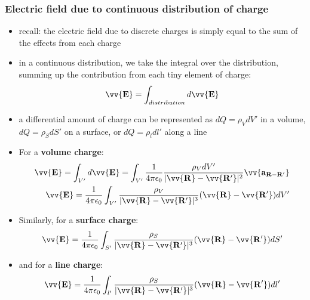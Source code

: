 \documentclass[10pt]{article}
\begin{document}
\subsubsection{Electric field due to continuous distribution of charge}
\begin{itemize}
    \item recall: the electric field due to discrete charges is simply equal to the sum of the effects from each charge
    \item in a continuous distribution, we take the integral over the distribution, summing up the contribution from each tiny element of charge:
    \begin{align}
        \vv{\mathbf{E}} = \int_{distribution} d \vv{\mathbf{E}}
    \end{align}
    \item a differential amount of charge can be represented as $dQ = \rho_V dV'$ in a volume, $dQ = \rho_S dS'$ on a surface, or $dQ = \rho_l dl'$ along a line 
    \item For a \textbf{volume charge}:
    \begin{align}
        \vv{\mathbf{E}} = \int_{V'} d \vv{\mathbf{E}} = \int_{V'} \frac{1}{4\pi\epsilon_0} \frac{\rho_V dV'}{|\vv{\mathbf{R}} - \vv{\mathbf{R'}}|^2} \vv{\mathbf{a_{R-R'}}} \\
       \vv{\mathbf{E}} =  \frac{1}{4\pi\epsilon_0} \int_{V'} \frac{\rho_{V}}{|\vv{\mathbf{R}} - \vv{\mathbf{R'}}|^3} (\vv{\mathbf{R}} - \vv{\mathbf{R'}}) dV'
    \end{align}
    \item Similarly, for a \textbf{surface charge}:
    \begin{align}
       \vv{\mathbf{E}} =  \frac{1}{4\pi\epsilon_0} \int_{S'} \frac{\rho_{S}}{|\vv{\mathbf{R}} - \vv{\mathbf{R'}}|^3} (\vv{\mathbf{R}} - \vv{\mathbf{R'}}) dS'
    \end{align}
    \item and for a \textbf{line charge}:
    \begin{align}
       \vv{\mathbf{E}} =  \frac{1}{4\pi\epsilon_0} \int_{l'} \frac{\rho_{S}}{|\vv{\mathbf{R}} - \vv{\mathbf{R'}}|^3} (\vv{\mathbf{R}} - \vv{\mathbf{R'}}) dl'
    \end{align}
\end{itemize}
\end{document}
